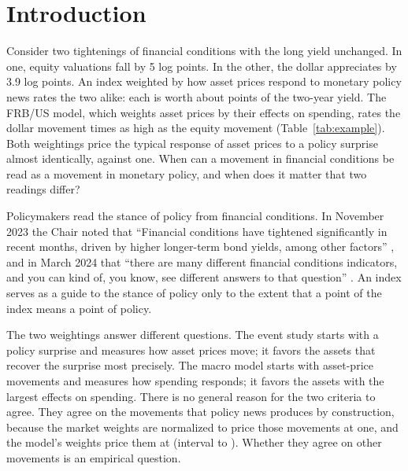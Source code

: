 \documentclass[11pt]{article}
\begin{document}
\section{Introduction}
\label{sec:intro}
Consider two tightenings of financial conditions with the long yield unchanged. In one, equity valuations fall by 5 log points. In the other, the dollar appreciates by 3.9 log points. An index weighted by how asset prices respond to monetary policy news rates the two alike: each is worth about  points of the two-year yield. The FRB/US model, which weights asset prices by their effects on spending, rates the dollar movement  times as high as the equity movement (Table~\ref{tab:example}). Both weightings price the typical response of asset prices to a policy surprise almost identically,  against one. When can a movement in financial conditions be read as a movement in monetary policy, and when does it matter that two readings differ?

Policymakers read the stance of policy from financial conditions. In November 2023 the Chair noted that ``Financial conditions have tightened significantly in recent months, driven by higher longer-term bond yields, among other factors'' \citep{powell2023}, and in March 2024 that ``there are many different financial conditions indicators, and you can kind of, you know, see different answers to that question'' \citep{powell2024}. An index serves as a guide to the stance of policy only to the extent that a point of the index means a point of policy.

The two weightings answer different questions. The event study starts with a policy surprise and measures how asset prices move; it favors the assets that recover the surprise most precisely. The macro model starts with asset-price movements and measures how spending responds; it favors the assets with the largest effects on spending. There is no general reason for the two criteria to agree. They agree on the movements that policy news produces by construction, because the market weights are normalized to price those movements at one, and the model's weights price them at  (interval  to ). Whether they agree on other movements is an empirical question.
\end{document}
